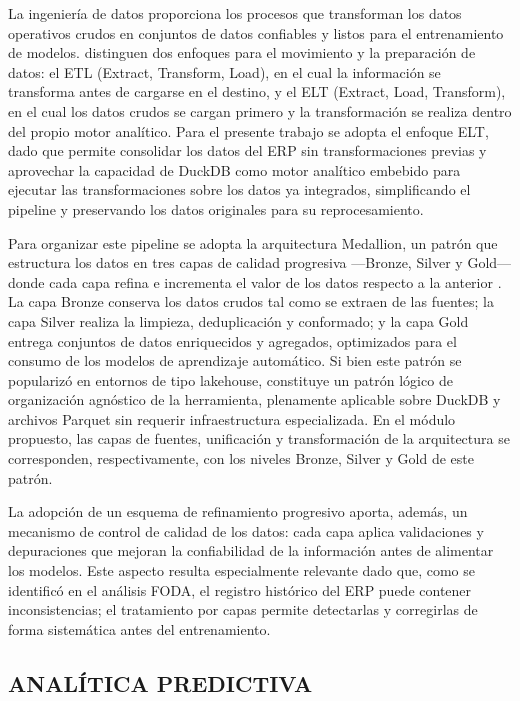 \documentclass{univalle-perfil}
\begin{document}
La ingeniería de datos proporciona los procesos que transforman los datos operativos crudos en conjuntos de datos confiables y listos para el entrenamiento de modelos. \textcite{ReisHousley2022} distinguen dos enfoques para el movimiento y la preparación de datos: el ETL (Extract, Transform, Load), en el cual la información se transforma antes de cargarse en el destino, y el ELT (Extract, Load, Transform), en el cual los datos crudos se cargan primero y la transformación se realiza dentro del propio motor analítico. Para el presente trabajo se adopta el enfoque ELT, dado que permite consolidar los datos del ERP sin transformaciones previas y aprovechar la capacidad de DuckDB como motor analítico embebido para ejecutar las transformaciones sobre los datos ya integrados, simplificando el pipeline y preservando los datos originales para su reprocesamiento.

Para organizar este pipeline se adopta la arquitectura Medallion, un patrón que estructura los datos en tres capas de calidad progresiva —Bronze, Silver y Gold— donde cada capa refina e incrementa el valor de los datos respecto a la anterior \parencite{DatabricksMedallion}. La capa Bronze conserva los datos crudos tal como se extraen de las fuentes; la capa Silver realiza la limpieza, deduplicación y conformado; y la capa Gold entrega conjuntos de datos enriquecidos y agregados, optimizados para el consumo de los modelos de aprendizaje automático. Si bien este patrón se popularizó en entornos de tipo lakehouse, constituye un patrón lógico de organización agnóstico de la herramienta, plenamente aplicable sobre DuckDB y archivos Parquet sin requerir infraestructura especializada. En el módulo propuesto, las capas de fuentes, unificación y transformación de la arquitectura se corresponden, respectivamente, con los niveles Bronze, Silver y Gold de este patrón.

La adopción de un esquema de refinamiento progresivo aporta, además, un mecanismo de control de calidad de los datos: cada capa aplica validaciones y depuraciones que mejoran la confiabilidad de la información antes de alimentar los modelos. Este aspecto resulta especialmente relevante dado que, como se identificó en el análisis FODA, el registro histórico del ERP puede contener inconsistencias; el tratamiento por capas permite detectarlas y corregirlas de forma sistemática antes del entrenamiento.

\subsection{ANALÍTICA PREDICTIVA}
\end{document}
